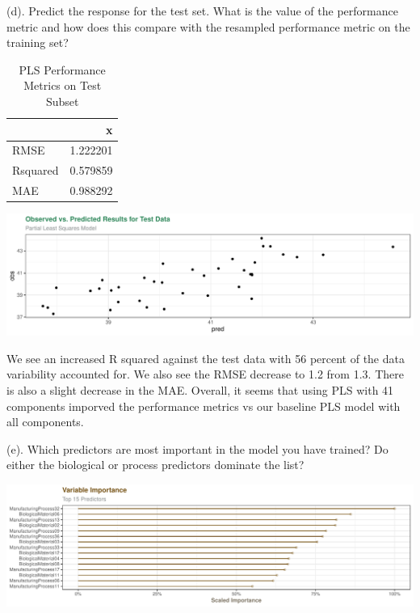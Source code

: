 \documentclass[]{report}
\begin{document}
\begin{subquestion}{(d).} Predict the response for the test set. What is the value of the performance metric and how does this compare with the resampled performance metric on the training set? 
\end{subquestion}

\begin{table}[H]

\caption{\label{tab:kj-6.3d}PLS Performance Metrics on Test Subset}
\centering
\begin{tabular}[t]{l|r}
\hline
  & x\\
\hline
\rowcolor{gray!6}  RMSE & 1.222201\\
\hline
Rsquared & 0.579859\\
\hline
\rowcolor{gray!6}  MAE & 0.988292\\
\hline
\end{tabular}
\end{table}

\includegraphics{Homework-Two_files/figure-latex/kj-6.3d-1.pdf}

We see an increased R squared against the test data with 56 percent of
the data variability accounted for. We also see the RMSE decrease to 1.2
from 1.3. There is also a slight decrease in the MAE. Overall, it seems
that using PLS with 41 components imporved the performance metrics vs
our baseline PLS model with all components.

\begin{subquestion}{(e).} Which predictors are most important in the model you have trained? Do either the biological or process predictors dominate the list? 
\end{subquestion}

\includegraphics{Homework-Two_files/figure-latex/kj-6.3e-1.pdf}
\end{document}
